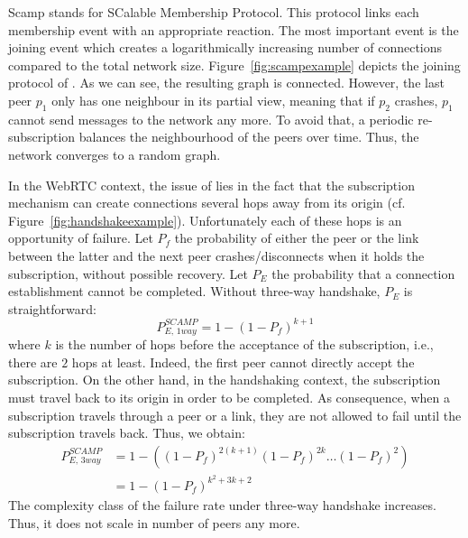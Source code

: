 \begin{asparadesc}
\item [Scamp]\cite{ganesh2001scamp,ganesh2003peer} stands for SCalable
  Membership Protocol. This protocol links each membership event with an
  appropriate reaction.  The most important event is the joining event which
  creates a logarithmically increasing number of connections compared to the
  total network size.  Figure~\ref{fig:scampexample} depicts the joining
  protocol of \SCAMP{}. As we can see, the resulting graph is
  connected. However, the last peer $p_1$ only has one neighbour in its partial
  view, meaning that if $p_2$ crashes, $p_1$ cannot send messages to the
  network any more. To avoid that, a periodic re-subscription balances the
  neighbourhood of the peers over time. Thus, the network converges to a random
  graph.

  In the WebRTC context, the issue of \SCAMP{} lies in the fact that the
  subscription mechanism can create connections several hops away from its
  origin (cf. Figure~\ref{fig:handshakeexample}). Unfortunately each of these
  hops is an opportunity of failure. Let $P_f$ the probability of either the
  peer or the link between the latter and the next peer crashes/disconnects
  when it holds the subscription, without possible recovery. Let $P_E$ the
  probability that a connection establishment cannot be completed. Without
  three-way handshake, $P_E$ is straightforward:
  \begin{equation} P_{E,\,1way}^{SCAMP}=1-(1- P_f)^{k+1} \end{equation} where
  $k$ is the number of hops before the acceptance of the subscription, i.e.,
  there are $2$ hops at least. Indeed, the first peer cannot directly accept
  the subscription. On the other hand, in the handshaking context, the
  subscription must travel back to its origin in order to be completed. As
  consequence, when a subscription travels through a peer or a link, they are
  not allowed to fail until the subscription travels back. Thus, we obtain:
  \begin{align} P_{E,\,3way}^{SCAMP} &=1 - ((1-P_f)^{2(k+1)} (1-P_f)^{2k}
                                       \ldots (1-P_f)^2) \nonumber \\
                                     &=1-(1-P_f)^{k^2+3k+2}
  \end{align}
  The complexity class of the \SCAMP{} failure rate under three-way handshake
  increases. Thus, it does not scale in number of peers any more.
\end{asparadesc}


